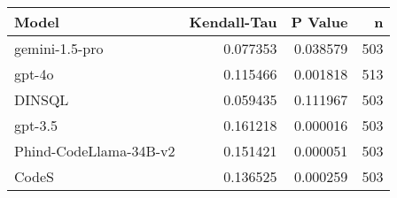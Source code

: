 \begin{tabular}{lrrr}
\toprule
Model & Kendall-Tau & P Value & n \\
\midrule
gemini-1.5-pro & 0.077353 & 0.038579 & 503 \\
gpt-4o & 0.115466 & 0.001818 & 513 \\
DINSQL & 0.059435 & 0.111967 & 503 \\
gpt-3.5 & 0.161218 & 0.000016 & 503 \\
Phind-CodeLlama-34B-v2 & 0.151421 & 0.000051 & 503 \\
CodeS & 0.136525 & 0.000259 & 503 \\
\bottomrule
\end{tabular}
